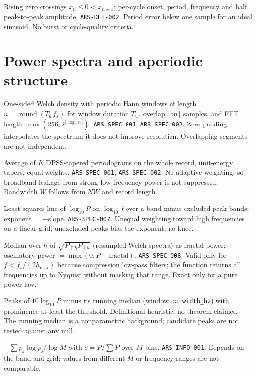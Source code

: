 {Rising zero crossings $x_n\le0<x_{n+1}$; per-cycle onset, period, frequency and half peak-to-peak amplitude.}
{\texttt{ARS-DET-002}.}
{Period error below one sample for an ideal sinusoid. No burst or cycle-quality criteria.}

\section{Power spectra and aperiodic structure}
{One-sided Welch density with periodic Hann windows of length $n=\operatorname{round}(T_wf_s)$ for window duration $T_w$, overlap $\lfloor on\rfloor$ samples, and FFT length $\max(256,2^{\lceil\log_2 n\rceil})$.}
{\texttt{ARS-SPEC-001}, \texttt{ARS-SPEC-002}.}
{Zero-padding interpolates the spectrum; it does not improve resolution. Overlapping segments are not independent.}

{Average of $K$ DPSS-tapered periodograms on the whole record, unit-energy tapers, equal weights.}
{\texttt{ARS-SPEC-001}, \texttt{ARS-SPEC-002}.}
{No adaptive weighting, so broadband leakage from strong low-frequency power is not suppressed. Bandwidth $W$ follows from $NW$ and record length.}

{Least-squares line of $\log_{10}P$ on $\log_{10}f$ over a band minus excluded peak bands; exponent $=-$slope.}
{\texttt{ARS-SPEC-007}.}
{Unequal weighting toward high frequencies on a linear grid; unexcluded peaks bias the exponent; no knee.}

{Median over $h$ of $\sqrt{P_{\uparrow h}P_{\downarrow h}}$ (resampled Welch spectra) as fractal power; oscillatory power $=\max(0,P-\text{fractal})$.}
{\texttt{ARS-SPEC-008}.}
{Valid only for $f<f_s/(2h_{\max})$ because compression low-pass filters; the function returns all frequencies up to Nyquist without masking that range. Exact only for a pure power law.}

{Peaks of $10\log_{10}P$ minus its running median (window $\approx$ \texttt{width\_hz}) with prominence at least the threshold.}
{Definitional heuristic; no theorem claimed.}
{The running median is a nonparametric background; candidate peaks are not tested against any null.}

{$-\sum p_j\log p_j/\log M$ with $p=P/\sum P$ over $M$ bins.}
{\texttt{ARS-INFO-001}.}
{Depends on the band and grid; values from different $M$ or frequency ranges are not comparable.}


